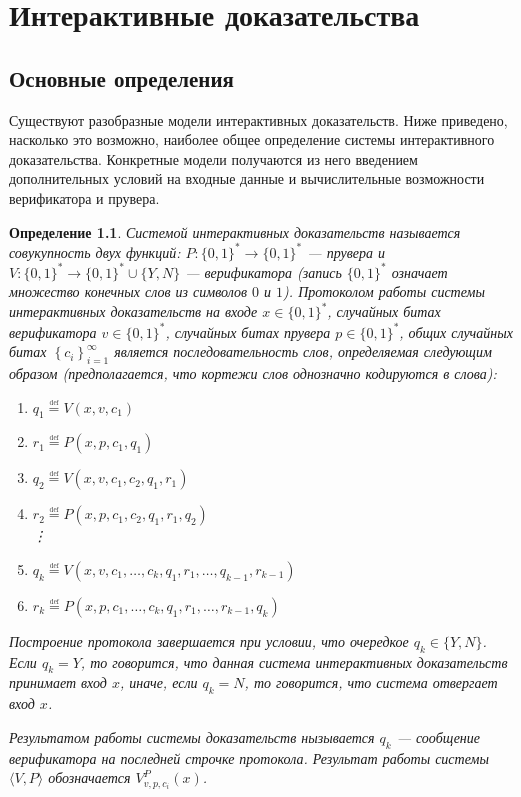 \documentclass[14pt, a4paper, russian]{report}
\newtheorem{definition}{\indent Определение}
\newcommand{\word}{\{0, 1\}^*}
\newcommand{\defeq}{\overset{\underset{\mathrm{def}}{}}{=}}
\begin{document}
\chapter{Интерактивные доказательства}
\section{Основные определения}
Существуют разобразные модели интерактивных доказательств. Ниже приведено, насколько это возможно, наиболее общее определение системы интерактивного доказательства. Конкретные модели получаются из него введением дополнительных условий на входные данные и вычислительные возможности верификатора и прувера.
\begin{definition}\label{ip_system}
    Системой интерактивных доказательств называется совукупность двух функций: $P: \word \longrightarrow \word$ --- прувера и $V: \word \longrightarrow \word \cup \{Y, N\}$ --- верификатора (запись $\word$ означает множество конечных слов из символов $0$ и $1$). Протоколом работы системы интерактивных доказательств на входе $x \in \word$, случайных битах верификатора $v \in \word$, случайных битах прувера $p \in \word$, общих случайных битах $\left\{c_i\right\}_{i=1}^{\infty}$ является последовательность слов, определяемая следующим образом (предполагается, что кортежи слов однозначно кодируются в слова):
    \begin{enumerate}
        \item $q_1 \defeq V(x, v, c_1)$
        \item $r_1 \defeq P(x, p, c_1, q_1)$
        \item $q_2 \defeq V(x, v, c_1, c_2, q_1, r_1)$
        \item $r_2 \defeq P(x, p, c_1, c_2, q_1, r_1, q_2)$\\
            \vdots
        \item $q_k \defeq V(x, v, c_1, \ldots, c_k, q_1, r_1, \ldots, q_{k-1}, r_{k-1})$
        \item $r_k \defeq P(x, p, c_1, \ldots, c_k, q_1, r_1, \ldots, r_{k-1}, q_k)$
    \end{enumerate}
    Построение протокола завершается при условии, что очередкое $q_k \in \{Y, N\}$. Если $q_k = Y$, то говорится, что данная система интерактивных доказательств принимает вход $x$, иначе, если $q_k = N$, то говорится, что система отвергает вход $x$.

    Результатом работы системы доказательств нызывается $q_k$ --- сообщение верификатора на последней строчке протокола. Результат работы системы $\langle V, P\rangle$ обозначается $V^{P}_{v, p, c_i}(x)$.
\end{definition}
\end{document}
